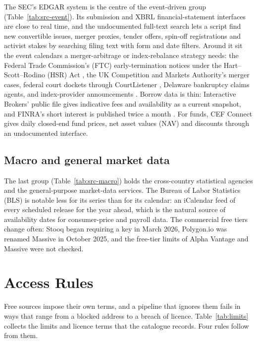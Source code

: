 \documentclass[10pt, a4paper, twocolumn]{article}
\begin{document}
The SEC's EDGAR system \cite{sec} is the centre of the event-driven group (Table~\ref{tab:src-event}). Its submission and XBRL financial-statement interfaces are close to real time, and the undocumented full-text search lets a script find new convertible issues, merger proxies, tender offers, spin-off registrations and activist stakes by searching filing text with form and date filters. Around it sit the event calendars a merger-arbitrage or index-rebalance strategy needs: the Federal Trade Commission's (FTC) early-termination notices under the Hart--Scott--Rodino (HSR) Act \cite{ftc}, the UK Competition and Markets Authority's merger cases, federal court dockets through CourtListener \cite{cl}, Delaware bankruptcy claims agents, and index-provider announcements \cite{lseg}. Borrow data is thin: Interactive Brokers' public file gives indicative fees and availability as a current snapshot, and FINRA's short interest is published twice a month \cite{finra}. For funds, CEF Connect gives daily closed-end fund prices, net asset values (NAV) and discounts through an undocumented interface.

\subsection{Macro and general market data}

The last group (Table~\ref{tab:src-macro}) holds the cross-country statistical agencies and the general-purpose market-data services. The Bureau of Labor Statistics (BLS) is notable less for its series than for its calendar: an iCalendar feed of every scheduled release for the year ahead, which is the natural source of availability dates for consumer-price and payroll data. The commercial free tiers change often: Stooq began requiring a key in March 2026, Polygon.io was renamed Massive in October 2025, and the free-tier limits of Alpha Vantage and Massive were not checked.

\section{Access Rules}
\label{sec:access}

Free sources impose their own terms, and a pipeline that ignores them fails in ways that range from a blocked address to a breach of licence. Table~\ref{tab:limits} collects the limits and licence terms that the catalogue records. Four rules follow from them.
\end{document}
